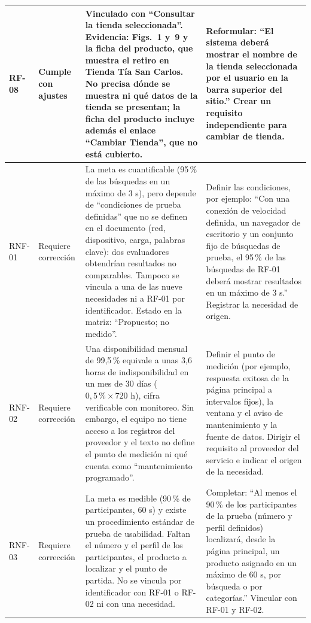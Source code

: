 \documentclass[11pt,a4paper]{article}
\begin{document}
\begin{longtable}{|L{0.075\textwidth}|L{0.11\textwidth}|L{0.40\textwidth}|L{0.31\textwidth}|}
RF-08 & Cumple con ajustes &
Vinculado con ``Consultar la tienda seleccionada''. Evidencia:
Figs.~1 y~9 y la ficha del producto, que
muestra el retiro en Tienda Tía San Carlos. No precisa dónde se
muestra ni qué datos de la tienda se presentan; la ficha del
producto incluye además el enlace ``Cambiar Tienda'', que no está
cubierto. &
Reformular: ``El sistema deberá mostrar el nombre de la tienda
seleccionada por el usuario en la barra superior del sitio.''
Crear un requisito independiente para cambiar de tienda. \\
\hline

RNF-01 & Requiere corrección &
La meta es cuantificable (95\,\% de las búsquedas en un máximo
de 3 s), pero depende de ``condiciones de prueba definidas'' que
no se definen en el documento (red, dispositivo, carga, palabras
clave): dos evaluadores obtendrían resultados no comparables.
Tampoco se vincula a una de las nueve necesidades ni a RF-01
por identificador. Estado en la matriz: ``Propuesto; no medido''. &
Definir las condiciones, por ejemplo: ``Con una conexión de
velocidad definida, un navegador de escritorio y un conjunto
fijo de búsquedas de prueba, el 95\,\% de las búsquedas de RF-01
deberá mostrar resultados en un máximo de 3 s.'' Registrar la
necesidad de origen. \\
\hline

RNF-02 & Requiere corrección &
Una disponibilidad mensual de 99,5\,\% equivale a unas
3,6 horas de indisponibilidad en un mes de 30 días
($0{,}5\,\% \times 720$ h), cifra verificable con monitoreo. Sin
embargo, el equipo no tiene acceso a los registros del proveedor y
el texto no define el punto de medición ni qué cuenta como
``mantenimiento programado''. &
Definir el punto de medición (por ejemplo, respuesta exitosa de la
página principal a intervalos fijos), la ventana y el aviso de
mantenimiento y la fuente de datos. Dirigir el requisito al
proveedor del servicio e indicar el origen de la necesidad. \\
\hline

RNF-03 & Requiere corrección &
La meta es medible (90\,\% de participantes, 60 s) y existe un
procedimiento estándar de prueba de usabilidad. Faltan el número
y el perfil de los participantes, el producto a localizar y el
punto de partida. No se vincula por identificador con RF-01 o
RF-02 ni con una necesidad. &
Completar: ``Al menos el 90\,\% de los participantes de la prueba
(número y perfil definidos) localizará, desde la página principal,
un producto asignado en un máximo de 60 s, por búsqueda o por
categorías.'' Vincular con RF-01 y RF-02. \\
\hline


\end{longtable}
\end{document}
